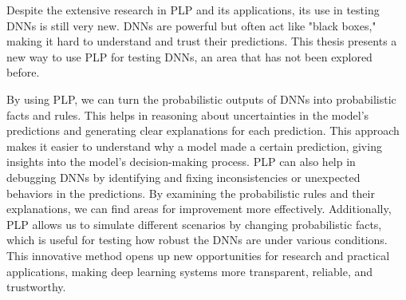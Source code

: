 Despite the extensive research in PLP and its applications, its use in testing DNNs is still very new. DNNs are powerful but often act like "black boxes," making it hard to understand and trust their predictions. This thesis presents a new way to use PLP for testing DNNs, an area that has not been explored before.

By using PLP, we can turn the probabilistic outputs  of DNNs into probabilistic facts and rules. This helps in reasoning about uncertainties in the model's predictions and generating clear explanations for each prediction. This approach makes it easier to understand why a model made a certain prediction, giving insights into the model’s decision-making process. PLP can also help in debugging DNNs by identifying and fixing inconsistencies or unexpected behaviors in the predictions. By examining the probabilistic rules and their explanations, we can find areas for improvement more effectively. Additionally, PLP allows us to simulate different scenarios by changing probabilistic facts, which is useful for testing how robust the DNNs are under various conditions. This innovative method opens up new opportunities for research and practical applications, making deep learning systems more transparent, reliable, and trustworthy.


